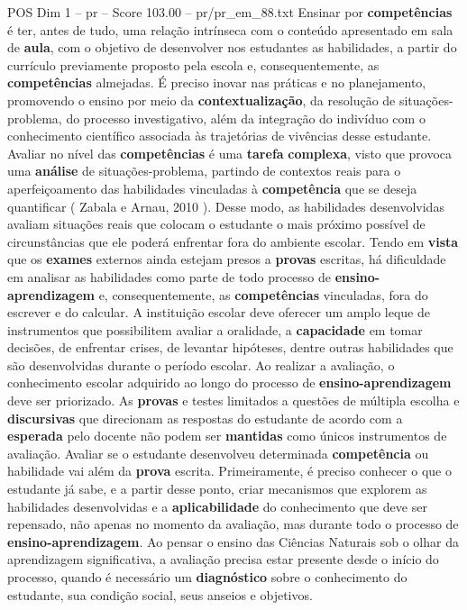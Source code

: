 \begin{textsample}{POS Dim 1 – pr – Score 103.00 – pr/pr\_em\_88.txt}
Ensinar por \textbf{competências} é ter, antes de tudo, uma relação intrínseca com o conteúdo apresentado em sala de \textbf{aula}, com o objetivo de desenvolver nos estudantes as habilidades, a partir do currículo previamente proposto pela escola e, consequentemente, as \textbf{competências} almejadas.
É preciso inovar nas práticas e no planejamento, promovendo o ensino por meio da \textbf{contextualização}, da resolução de situações-problema, do processo investigativo, além da integração do indivíduo com o conhecimento científico associada às trajetórias de vivências desse estudante.
Avaliar no nível das \textbf{competências} é uma \textbf{tarefa} \textbf{complexa}, visto que provoca uma \textbf{análise} de situações-problema, partindo de contextos reais para o aperfeiçoamento das habilidades vinculadas à \textbf{competência} que se deseja quantificar ( Zabala e Arnau, 2010 ).
Desse modo, as habilidades desenvolvidas avaliam situações reais que colocam o estudante o mais próximo possível de circunstâncias que ele poderá enfrentar fora do ambiente escolar.
Tendo em \textbf{vista} que os \textbf{exames} externos ainda estejam presos a \textbf{provas} escritas, há dificuldade em analisar as habilidades como parte de todo processo de \textbf{ensino-aprendizagem} e, consequentemente, as \textbf{competências} vinculadas, fora do escrever e do calcular.
A instituição escolar deve oferecer um amplo leque de instrumentos que possibilitem avaliar a oralidade, a \textbf{capacidade} em tomar decisões, de enfrentar crises, de levantar hipóteses, dentre outras habilidades que são desenvolvidas durante o período escolar.
Ao realizar a avaliação, o conhecimento escolar adquirido ao longo do processo de \textbf{ensino-aprendizagem} deve ser priorizado.
As \textbf{provas} e testes limitados a questões de múltipla escolha e \textbf{discursivas} que direcionam as respostas do estudante de acordo com a \textbf{esperada} pelo docente não podem ser \textbf{mantidas} como únicos instrumentos de avaliação.
Avaliar se o estudante desenvolveu determinada \textbf{competência} ou habilidade vai além da \textbf{prova} escrita.
Primeiramente, é preciso conhecer o que o estudante já sabe, e a partir desse ponto, criar mecanismos que explorem as habilidades desenvolvidas e a \textbf{aplicabilidade} do conhecimento que deve ser repensado, não apenas no momento da avaliação, mas durante todo o processo de \textbf{ensino-aprendizagem}.
Ao pensar o ensino das Ciências Naturais sob o olhar da aprendizagem significativa, a avaliação precisa estar presente desde o início do processo, quando é necessário um \textbf{diagnóstico} sobre o conhecimento do estudante, sua condição social, seus anseios e objetivos.

\end{textsample}
